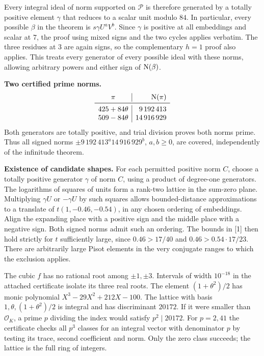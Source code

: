 \documentclass[11pt,a4paper,oneside,openany]{book}
\begin{document}
Every integral ideal of norm supported on $\mathcal P$ is therefore generated by a totally positive element $\gamma$ that reduces to a scalar unit modulo $84$. In particular, every possible $\beta$ in the theorem is $s\gamma U^aV^b$. Since $\gamma$ is positive at all embeddings and scalar at $7$, the proof using mixed signs and the two cycles applies verbatim. The three residues at $3$ are again signs, so the complementary $h=1$ proof also applies. This treats every generator of every possible ideal with these norms, allowing arbitrary powers and either sign of $\operatorname{N}(\beta)$.

\textbf{Two certified prime norms.}
\[
\begin{array}{c|r}
\pi&\Nm(\pi)\\ \midrule
425+84\theta&9\,192\,413\\
509-84\theta&14\,916\,929
\end{array}
\]
Both generators are totally positive, and trial division proves both norms prime. Thus all signed norms $\pm9\,192\,413^a14\,916\,929^b$, $a,b\ge0$, are covered, independently of the infinitude theorem.

\textbf{Existence of candidate shapes.} For each permitted positive norm $C$, choose a totally positive generator $\gamma$ of norm $C$, using a product of degree-one generators. The logarithms of squares of units form a rank-two lattice in the sum-zero plane. Multiplying $\gamma U$ or $-\gamma U$ by such squares allows bounded-distance approximations to a translate of $t(1,-0.46,-0.54)$, in any chosen ordering of embeddings. Align the expanding place with a positive sign and the middle place with a negative sign. Both signed norms admit such an ordering. The bounds in [1] then hold strictly for $t$ sufficiently large, since $0.46>17/40$ and $0.46>0.54\cdot17/23$. There are arbitrarily large Pisot elements in the very conjugate ranges to which the exclusion applies.



The cubic $f$ has no rational root among $\pm1,\pm3$. Intervals of width $10^{-18}$ in the attached certificate isolate its three real roots. The element $(1+\theta^2)/2$ has monic polynomial $X^3-29X^2+212X-100$. The lattice with basis $1,\theta,(1+\theta^2)/2$ is integral and has discriminant $20172$. If it were smaller than $\mathcal O_K$, a prime $p$ dividing the index would satisfy $p^2\mid20172$. For $p=2,41$ the certificate checks all $p^3$ classes for an integral vector with denominator $p$ by testing its trace, second coefficient and norm. Only the zero class succeeds; the lattice is the full ring of integers.
\end{document}
